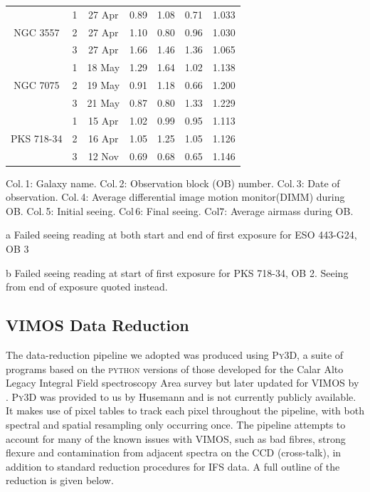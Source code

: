\begin{table}
\begin{threeparttable}
\begin{tabular}{c c c c c c c}
			\hline
				\multirow{3}{*}{NGC 3557}& 1 & 27 Apr & 0.89 & 1.08 & 0.71 & 1.033 \\
				& 2 & 27 Apr & 1.10 & 0.80 & 0.96 & 1.030 \\
				& 3 & 27 Apr  & 1.66 & 1.46 & 1.36 & 1.065 \\
			\hline
				\multirow{3}{*}{NGC 7075}& 1 & 18 May & 1.29 & 1.64 & 1.02 & 1.138 \\
				& 2 & 19 May & 0.91 & 1.18 & 0.66 & 1.200 \\
				& 3 & 21 May & 0.87 & 0.80 & 1.33 & 1.229 \\
			\hline
				\multirow{3}{*}{PKS 718-34}& 1 & 15 Apr & 1.02 & 0.99 & 0.95 & 1.113 \\
				& 2 & 16 Apr & 1.05 & 1.25\tnote{b} & 1.05 & 1.126 \\
				& 3 & 12 Nov  & 0.69 & 0.68 & 0.65 & 1.146 \\
			\hline
			\hline
		\end{tabular}
			\begin{tablenotes}
			\footnotesize
			\note Col.\,1: Galaxy name. Col.\,2: Observation block (OB) number. Col.\,3: Date of observation. Col.\,4: Average differential image motion monitor(DIMM) during OB. Col.\,5: Initial seeing. Col\,6: Final seeing. Col\.7: Average airmass during OB.
			\item [a] Failed seeing reading at both start and end of first exposure for ESO 443-G24, OB 3 
			\item [b] Failed seeing reading at start of first exposure for PKS 718-34, OB 2. Seeing from end of exposure quoted instead. 
			\end{tablenotes}
		\end{threeparttable}
		\end{table}

	\subsection{VIMOS Data Reduction}
		\label{subsec:VIMOSreduction}
		The data-reduction pipeline we adopted was produced using \textsc{Py3D}, a suite of programs based on the \textsc{python} versions of those developed for the Calar Alto Legacy Integral Field spectroscopy Area survey \citep[CALIFA;][]{Sanchez2012, Husemann2013} but later updated for VIMOS by \citet{Husemann2014}. \textsc{Py3D} was provided to us by Husemann and is not currently publicly available. It  makes use of pixel tables to track each pixel throughout the pipeline, with both spectral and spatial resampling only occurring once. The pipeline attempts to account for many of the known issues with VIMOS, such as bad fibres, strong flexure and contamination from adjacent spectra on the CCD (cross-talk), in addition to standard reduction procedures for IFS data. A full outline of the reduction is given below.

